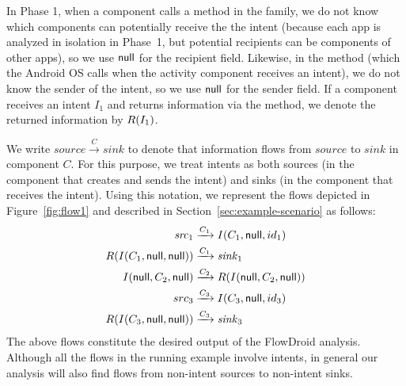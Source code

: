 \begin{sloppypar}
In Phase 1, when a component calls a method in the  family,
we do not know which components can potentially receive the the intent 
(because each app is analyzed in isolation in Phase~1, but potential recipients can
be components of other apps),
so we use $\textsf{null}$ for
the recipient field.  Likewise, in the  method (which the Android
OS calls when the activity component receives an intent), we do not know
the sender of the intent, so we use $\textsf{null}$ for the sender field.
%
If a component receives an intent $I_1$ and returns information via
the  method, we denote the returned information by
$R(I_1)$.  
\end{sloppypar}

We write $\mathit{source} \xrightarrow{C} \mathit{sink}$ 
to denote that information flows from
$\mathit{source}$ to $\mathit{sink}$ in component $C$.  For this purpose, we treat intents as
both sources (in the component that creates and sends the intent) and sinks (in
the component that receives the intent).  Using this notation, we represent
the flows depicted in Figure~\ref{fig:flow1} and described in
Section~\ref{sec:example-scenario} as follows:
%
\begin{align*}
\mathit{src}_1 & \xrightarrow{C_1} I(C_1, \textsf{null}, id_1)
\\
R(I(C_1, \textsf{null}, \textsf{null})) & \xrightarrow{C_1} \mathit{sink}_1
\\
I(\textsf{null}, C_2, \textsf{null}) & \xrightarrow{C_2} R(I(\textsf{null}, C_2, \textsf{null}))
\\
src_3 & \xrightarrow{C_3} I(C_3, \textsf{null}, id_3)
\\
R(I(C_3, \textsf{null}, \textsf{null})) & \xrightarrow{C_3} \mathit{sink}_3
\end{align*}
%
The above flows constitute the desired output of the FlowDroid analysis.
Although all the flows in the running example involve intents, in general our
analysis will also find flows from non-intent sources to non-intent sinks.


